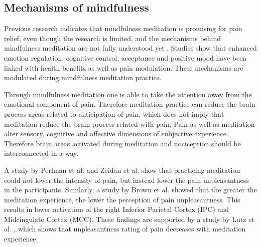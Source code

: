 

\subsection{Mechanisms of mindfulness}
Previous research indicates that mindfulness meditation is promising for pain relief, even though the research is limited, and the mechanisms behind mindfulness meditation are not fully understood yet \cite{Perlman2010}. 
Studies show that enhanced emotion regulation, cognitive control, acceptance and positive mood have been linked with health benefits as well as pain modulation. These mechanisms are modulated during mindfulness meditation practice. \cite{Ziedan2016, Ziedan2012, Tang2014, Perlman2010, Ziedan2011}

Through mindfulness meditation one is able to take the attention away from the emotional component of pain. Therefore meditation practice can reduce the brain process areas related to anticipation of pain, which does not imply that meditation reduce the brain process related with pain. \cite{Brown2010}
Pain as well as meditation alter sensory, cognitive and affective dimensions of subjective experience. Therefore brain areas activated during meditation and nociception should be interconnected in a way. \cite{Zeidan2011}

A study by Perlman et al. \cite{Perlman2010} and Zeidan et al. \cite{Zeidan2012} show that practicing meditation could not lower the intensity of pain, but instead lower the pain unpleasantness in the participants. Similarly, a study by Brown et al. \cite{Brown2010} showed that the greater the meditation experience, the lower the perception of pain unpleasantness. This results in lower activation of the right Inferior Parietal Cortex (IPC) and Midcingulate Cortex (MCC). \cite{Brown2010} These findings are supported by a study by Lutz et al. \cite{Lutz2013}, which shows that unpleasantness rating of pain decreases with meditation experience.
 



